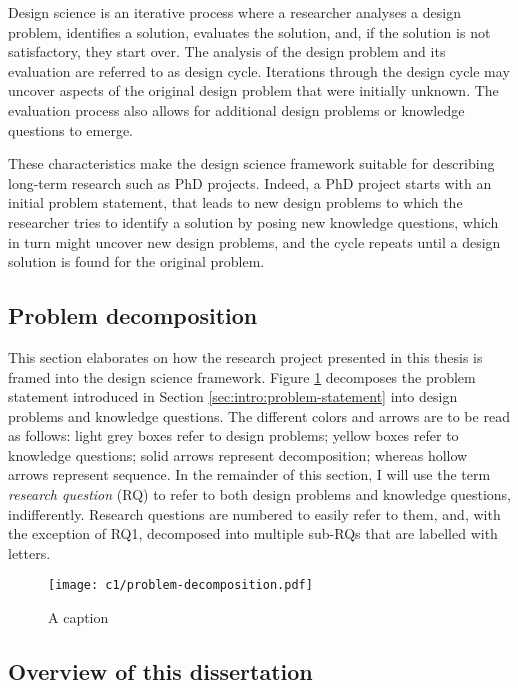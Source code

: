 Design science is an iterative process where a researcher analyses a design problem, identifies a solution, evaluates the solution, and, if the solution is not satisfactory, they start over. 
The analysis of the design problem and its evaluation are referred to as design cycle.
Iterations through the design cycle may uncover aspects of the original design problem that were initially unknown.
The evaluation process also allows for additional design problems or knowledge questions to emerge.

These characteristics make the design science framework suitable for describing long-term research such as PhD projects.
Indeed, a PhD project starts with an initial problem statement, that leads to new design problems to which the researcher tries to identify a solution by posing new knowledge questions, which in turn might uncover new design problems, and the cycle repeats until a design solution is found for the original problem.

\subsection{Problem decomposition}
This section elaborates on how the research project presented in this thesis is framed into the design science framework. 
Figure \ref{fig:intro:problem-decomposition} decomposes the problem statement introduced in Section \ref{sec:intro:problem-statement} into design problems and knowledge questions.
The different colors and arrows are to be read as follows: light grey boxes refer to design problems; yellow boxes refer to knowledge questions; solid arrows represent decomposition; whereas hollow arrows represent sequence.
In the remainder of this section, I will use the term \emph{research question} (RQ) to refer to both design problems and knowledge questions, indifferently.
Research questions are numbered to easily refer to them, and, with the exception of RQ1, decomposed into multiple sub-RQs that are labelled with letters.

\begin{figure}
    \centering
    \texttt{[image: c1/problem-decomposition.pdf]}
    \caption{A caption}\label{fig:intro:problem-decomposition}
\end{figure}

\subsection{Overview of this dissertation}

